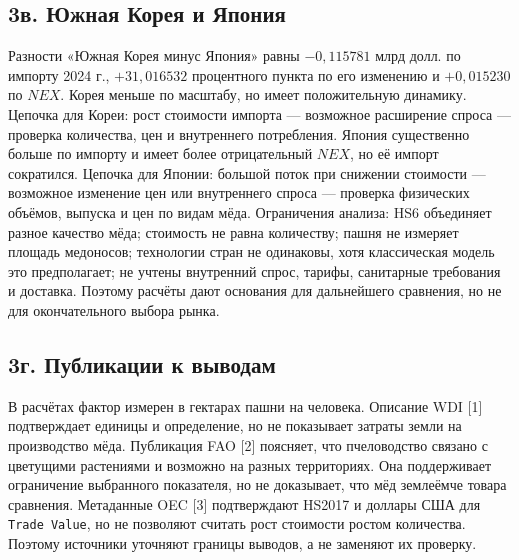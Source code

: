 \documentclass[11pt,a4paper]{article}
\begin{document}
\subsection*{3в. Южная Корея и Япония}
Разности «Южная Корея минус Япония» равны $-0{,}115781$ млрд долл. по импорту 2024 г., $+31{,}016532$ процентного пункта по его изменению и $+0{,}015230$ по $NEX$. Корея меньше по масштабу, но имеет положительную динамику. Цепочка для Кореи: рост стоимости импорта --- возможное расширение спроса --- проверка количества, цен и внутреннего потребления. Япония существенно больше по импорту и имеет более отрицательный $NEX$, но её импорт сократился. Цепочка для Японии: большой поток при снижении стоимости --- возможное изменение цен или внутреннего спроса --- проверка физических объёмов, выпуска и цен по видам мёда. Ограничения анализа: HS6 объединяет разное качество мёда; стоимость не равна количеству; пашня не измеряет площадь медоносов; технологии стран не одинаковы, хотя классическая модель это предполагает; не учтены внутренний спрос, тарифы, санитарные требования и доставка. Поэтому расчёты дают основания для дальнейшего сравнения, но не для окончательного выбора рынка.

\subsection*{3г. Публикации к выводам}
В расчётах фактор измерен в гектарах пашни на человека. Описание WDI [1] подтверждает единицы и определение, но не показывает затраты земли на производство мёда. Публикация FAO [2] поясняет, что пчеловодство связано с цветущими растениями и возможно на разных территориях. Она поддерживает ограничение выбранного показателя, но не доказывает, что мёд землеёмче товара сравнения. Метаданные OEC [3] подтверждают HS2017 и доллары США для \texttt{Trade Value}, но не позволяют считать рост стоимости ростом количества. Поэтому источники уточняют границы выводов, а не заменяют их проверку.
\end{document}
